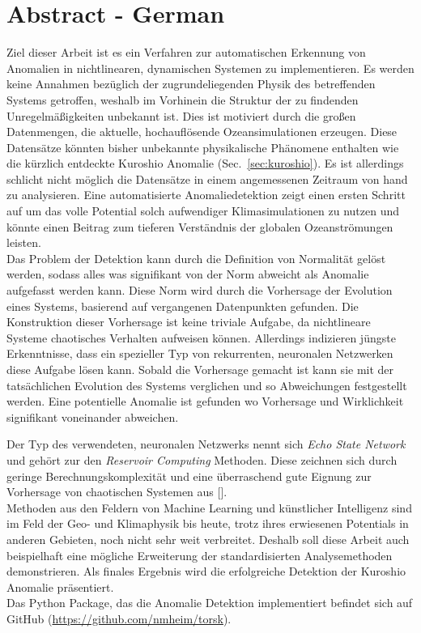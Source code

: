\section*{Abstract - German}%
\label{sec:abstract_de}

Ziel dieser Arbeit ist es ein Verfahren zur automatischen Erkennung von
Anomalien in nichtlinearen, dynamischen Systemen zu implementieren. Es werden
keine Annahmen bez{\"u}glich der zugrundeliegenden Physik des betreffenden
Systems getroffen, weshalb im Vorhinein die Struktur der zu findenden
Unregelm{\"a}{\ss}igkeiten unbekannt ist. Dies ist motiviert durch die
gro{\ss}en Datenmengen, die aktuelle, hochaufl{\"o}sende Ozeansimulationen
erzeugen. Diese Datens{\"a}tze k{\"o}nnten bisher unbekannte physikalische
Ph{\"a}nomene enthalten wie die k{\"u}rzlich entdeckte Kuroshio Anomalie
(Sec.~\ref{sec:kuroshio}).  Es ist allerdings schlicht nicht m{\"o}glich die
Datens{\"a}tze in einem angemessenen Zeitraum von hand zu analysieren.  Eine
automatisierte Anomaliedetektion zeigt einen ersten Schritt auf um das volle
Potential solch aufwendiger Klimasimulationen zu nutzen und k{\"o}nnte einen
Beitrag zum tieferen Verst{\"a}ndnis der globalen Ozeanstr{\"o}mungen
leisten.\\

Das Problem der Detektion kann durch die Definition von Normalit{\"a}t
gel{\"o}st werden, sodass alles was signifikant von der Norm abweicht als
Anomalie aufgefasst werden kann. Diese Norm wird durch die Vorhersage der
Evolution eines Systems, basierend auf vergangenen Datenpunkten gefunden. Die
Konstruktion dieser Vorhersage ist keine triviale Aufgabe, da nichtlineare
Systeme chaotisches Verhalten aufweisen k{\"o}nnen. Allerdings indizieren
j{\"u}ngste Erkenntnisse, dass ein spezieller Typ von rekurrenten, neuronalen
Netzwerken diese Aufgabe l{\"o}sen kann. Sobald die Vorhersage gemacht ist kann
sie mit der tats{\"a}chlichen Evolution des Systems verglichen und so
Abweichungen festgestellt werden. Eine potentielle Anomalie ist gefunden wo
Vorhersage und Wirklichkeit signifikant voneinander abweichen.

Der Typ des verwendeten, neuronalen Netzwerks nennt sich \emph{Echo State
Network} und geh{\"o}rt zur den \emph{Reservoir Computing} Methoden. Diese
zeichnen sich durch geringe Berechnungskomplexit{\"a}t und eine
{\"u}berraschend gute Eignung zur Vorhersage von chaotischen Systemen aus
[\cite{pathak2018model}].\\

Methoden aus den Feldern von Machine Learning und k{\"u}nstlicher Intelligenz
sind im Feld der Geo- und Klimaphysik bis heute, trotz ihres erwiesenen
Potentials in anderen Gebieten, noch nicht sehr weit verbreitet. Deshalb soll
diese Arbeit auch beispielhaft eine m{\"o}gliche Erweiterung der
standardisierten Analysemethoden demonstrieren. Als finales Ergebnis wird die
erfolgreiche Detektion der Kuroshio Anomalie pr{\"a}sentiert.\\

Das Python Package, das die Anomalie Detektion implementiert befindet sich auf
GitHub (\url{https://github.com/nmheim/torsk}).
